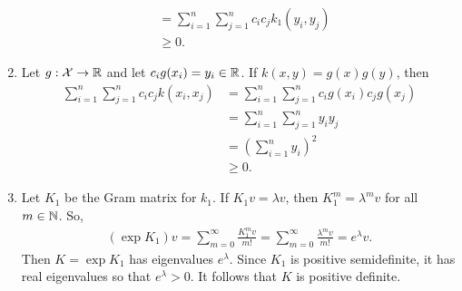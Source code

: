 \begin{enumerate}
\begin{align*}
        &= \sum_{i=1}^{n} \sum_{j=1}^{n} c_i c_j k_1(y_i, y_j)\\
        &\geq 0.
    \end{align*}
    \item Let \(g : \mathcal{X} \to \mathbb{R}\) and let \(c_i g(x_i) = y_i \in \mathbb{R}\).
    If \(k(x,y) = g(x)g(y)\), then
    \begin{align*}
        \sum_{i=1}^{n} \sum_{j=1}^{n} c_i c_j k(x_i,x_j)
        &= \sum_{i=1}^{n} \sum_{j=1}^{n} c_i g(x_i) c_j g(x_j)\\
        &= \sum_{i=1}^{n} \sum_{j=1}^{n} y_i y_j\\
        &= \left(\sum_{i=1}^{n} y_i\right)^2\\
        &\geq 0.
    \end{align*}
    \item Let \(K_1\) be the Gram matrix for \(k_1\).
    If \(K_1 v = \lambda v\), then \(K_1^m = \lambda^m v\) for all \(m \in \mathbb{N}\).
    So,
    \begin{align*}
        (\exp K_1) v
        = \sum_{m=0}^{\infty} \frac{K_1^m v}{m!}
        = \sum_{m=0}^{\infty} \frac{\lambda^m v}{m!}
        = e^\lambda v.
    \end{align*}
    Then \(K = \exp K_1\) has eigenvalues \(e^\lambda\).
    Since \(K_1\) is positive semidefinite, it has real eigenvalues so that \(e^\lambda > 0\).
    It follows that \(K\) is positive definite.
\end{enumerate}